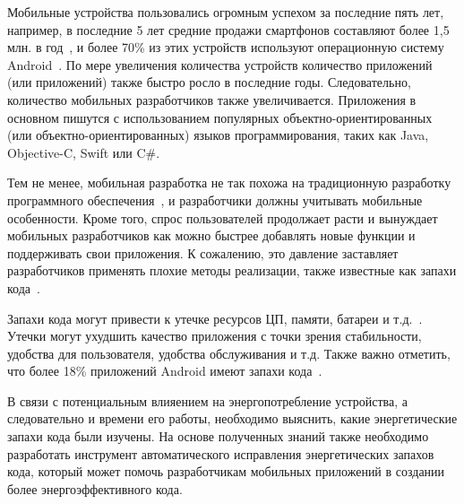 Мобильные устройства пользовались огромным успехом за последние пять лет, например, в последние 5 лет средние продажи смартфонов составляют более 1,5 млн. в год~\cite{globalsales}, и более 70\% из этих устройств используют операционную систему Android~\cite{worldwide}. По мере увеличения количества устройств количество приложений (или приложений) также быстро росло в последние годы. Следовательно, количество мобильных разработчиков также увеличивается. Приложения в основном пишутся с использованием популярных объектно-ориентиро\-ванных (или объектно-ориентированных) языков программирования, таких как Java, Objective-C, Swift или C\#. 

 Тем не менее, мобильная разработка не так похожа на традиционную разработку программного обеспечения~\cite{wasserman2010software}, и разработчики должны учитывать мобильные особенности. Кроме того, спрос пользователей продолжает расти и вынуждает мобильных разработчиков как можно быстрее добавлять новые функции и поддерживать свои приложения. К сожалению, это давление заставляет разработчиков применять плохие методы реализации, также известные как запахи кода~\cite{fowler2018refactoring}. 
 
 Запахи кода могут привести к утечке ресурсов ЦП, памяти, батареи и т.д.~\cite{cscatalogue}. Утечки могут ухудшить качество приложения с точки зрения стабильности, удобства для пользователя, удобства обслуживания и т.д. Также важно отметить, что более 18\% приложений Android имеют запахи кода~\cite{liu2014characterizing}.
 
 В связи с потенциальным влияением на энергопотребление устройства, а следовательно и времени его работы, необходимо выяснить, какие энергетические запахи кода были изучены. На основе полученных знаний также необходимо разработать инструмент автоматического исправления энергетических запахов кода, который может помочь разработчикам мобильных приложений в создании более энергоэффективного кода.



